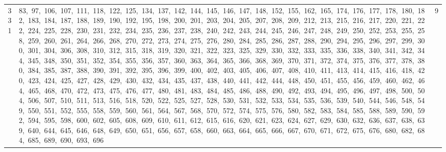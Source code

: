 \begin{longtable}{c|p{}|r}
331 & 83,\ 97,\ 106,\ 107,\ 111,\ 118,\ 122,\ 125,\ 134,\ 137,\ 142,\ 144,\ 145,\ 146,\ 147,\ 148,\ 152,\ 155,\ 162,\ 165,\ 174,\ 176,\ 177,\ 178,\ 180,\ 182,\ 183,\ 184,\ 187,\ 188,\ 189,\ 190,\ 192,\ 195,\ 198,\ 200,\ 201,\ 203,\ 204,\ 205,\ 207,\ 208,\ 209,\ 212,\ 213,\ 215,\ 216,\ 217,\ 220,\ 221,\ 222,\ 224,\ 225,\ 228,\ 230,\ 231,\ 232,\ 234,\ 235,\ 236,\ 237,\ 238,\ 240,\ 242,\ 243,\ 244,\ 245,\ 246,\ 247,\ 248,\ 249,\ 250,\ 252,\ 253,\ 255,\ 258,\ 259,\ 260,\ 261,\ 264,\ 266,\ 268,\ 270,\ 272,\ 273,\ 274,\ 275,\ 276,\ 280,\ 284,\ 285,\ 286,\ 287,\ 288,\ 290,\ 294,\ 295,\ 296,\ 297,\ 299,\ 300,\ 301,\ 304,\ 306,\ 308,\ 310,\ 312,\ 315,\ 318,\ 319,\ 320,\ 321,\ 322,\ 323,\ 325,\ 329,\ 330,\ 332,\ 333,\ 335,\ 336,\ 338,\ 340,\ 341,\ 342,\ 344,\ 345,\ 348,\ 350,\ 351,\ 352,\ 354,\ 355,\ 356,\ 357,\ 360,\ 363,\ 364,\ 365,\ 366,\ 368,\ 369,\ 370,\ 371,\ 372,\ 374,\ 375,\ 376,\ 377,\ 378,\ 380,\ 384,\ 385,\ 387,\ 388,\ 390,\ 391,\ 392,\ 395,\ 396,\ 399,\ 400,\ 402,\ 403,\ 405,\ 406,\ 407,\ 408,\ 410,\ 411,\ 413,\ 414,\ 415,\ 416,\ 418,\ 420,\ 423,\ 424,\ 425,\ 427,\ 428,\ 429,\ 430,\ 432,\ 434,\ 435,\ 437,\ 438,\ 440,\ 441,\ 442,\ 444,\ 448,\ 450,\ 451,\ 455,\ 456,\ 459,\ 460,\ 462,\ 464,\ 465,\ 468,\ 470,\ 472,\ 473,\ 475,\ 476,\ 477,\ 480,\ 481,\ 483,\ 484,\ 485,\ 486,\ 488,\ 490,\ 492,\ 493,\ 494,\ 495,\ 496,\ 497,\ 498,\ 500,\ 504,\ 506,\ 507,\ 510,\ 511,\ 513,\ 516,\ 518,\ 520,\ 522,\ 525,\ 527,\ 528,\ 530,\ 531,\ 532,\ 533,\ 534,\ 535,\ 536,\ 539,\ 540,\ 544,\ 546,\ 548,\ 549,\ 550,\ 551,\ 552,\ 555,\ 558,\ 559,\ 560,\ 561,\ 564,\ 567,\ 568,\ 570,\ 572,\ 574,\ 575,\ 576,\ 580,\ 582,\ 583,\ 584,\ 585,\ 588,\ 589,\ 590,\ 592,\ 594,\ 595,\ 598,\ 600,\ 602,\ 605,\ 608,\ 609,\ 610,\ 611,\ 612,\ 615,\ 616,\ 620,\ 621,\ 623,\ 624,\ 627,\ 629,\ 630,\ 632,\ 636,\ 637,\ 638,\ 639,\ 640,\ 644,\ 645,\ 646,\ 648,\ 649,\ 650,\ 651,\ 656,\ 657,\ 658,\ 660,\ 663,\ 664,\ 665,\ 666,\ 667,\ 670,\ 671,\ 672,\ 675,\ 676,\ 680,\ 682,\ 684,\ 685,\ 689,\ 690,\ 693,\ 696 & 9 \\

\end{longtable}
